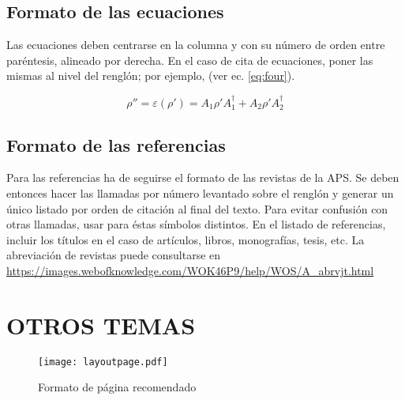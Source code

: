 \documentclass[10pt,twocolumn]{article}
\begin{document}
\subsection{Formato de las ecuaciones}
Las ecuaciones deben centrarse en la columna y con su número de orden entre paréntesis, alineado por derecha. En el caso de cita de ecuaciones, poner las mismas al nivel del renglón; por ejemplo, (ver ec. \ref{eq:four}).

\begin{equation}
  \rho''=\varepsilon(\rho')=A_{1}\rho' A_{1}^{\dag}+A_{2}\rho' A_{2}^{\dag}
 \label{eq:four}
\end{equation}


\subsection{Formato de las referencias}
Para las referencias ha de seguirse el formato de las revistas de la APS. Se deben entonces hacer las llamadas por número levantado\cite{fuchs1975theory} sobre el renglón y generar un único listado por orden de citación al final del texto. Para evitar confusión con otras llamadas, usar para éstas símbolos distintos. En el listado de referencias, incluir los títulos en el caso de artículos\cite{imoto197221}, libros, monografías, tesis, etc. La abreviación de revistas puede consultarse en \url{https://images.webofknowledge.com/WOK46P9/help/WOS/A_abrvjt.html}

\section{OTROS TEMAS}

   \begin{figure}[ht]
    \centering
    \texttt{[image: layoutpage.pdf]}
  \caption{Formato de página recomendado}
  \label{fig:figura1}
  \end{figure}

\lipsum[1-3]
\end{document}
